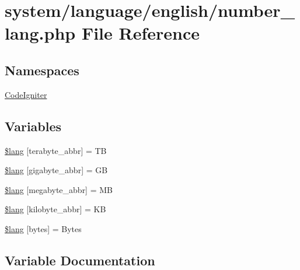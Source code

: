 \hypertarget{number__lang_8php}{}\section{system/language/english/number\+\_\+lang.php File Reference}
\label{number__lang_8php}
\subsection*{Namespaces}
\begin{DoxyCompactItemize}
\item 
 \mbox{\hyperlink{namespace_code_igniter}{Code\+Igniter}}
\end{DoxyCompactItemize}
\subsection*{Variables}
\begin{DoxyCompactItemize}
\item 
\mbox{\hyperlink{number__lang_8php_a04d138a22ffa60be85d7f5cc39d19edb}{\$lang}} \mbox{[}\textquotesingle{}terabyte\+\_\+abbr\textquotesingle{}\mbox{]} = \textquotesingle{}TB\textquotesingle{}
\item 
\mbox{\hyperlink{number__lang_8php_a033241e728572623642c100b94ae5cdf}{\$lang}} \mbox{[}\textquotesingle{}gigabyte\+\_\+abbr\textquotesingle{}\mbox{]} = \textquotesingle{}GB\textquotesingle{}
\item 
\mbox{\hyperlink{number__lang_8php_a302efee241ac11afb35642b3c2fe7da8}{\$lang}} \mbox{[}\textquotesingle{}megabyte\+\_\+abbr\textquotesingle{}\mbox{]} = \textquotesingle{}MB\textquotesingle{}
\item 
\mbox{\hyperlink{number__lang_8php_ab73e0c5fca6f933d051322e005a58b92}{\$lang}} \mbox{[}\textquotesingle{}kilobyte\+\_\+abbr\textquotesingle{}\mbox{]} = \textquotesingle{}KB\textquotesingle{}
\item 
\mbox{\hyperlink{number__lang_8php_a2d19ef1c5fb52a9f8eb7dcc3f210a36f}{\$lang}} \mbox{[}\textquotesingle{}bytes\textquotesingle{}\mbox{]} = \textquotesingle{}Bytes\textquotesingle{}
\end{DoxyCompactItemize}


\subsection{Variable Documentation}
\mbox{\label{number__lang_8php_a04d138a22ffa60be85d7f5cc39d19edb}} 
